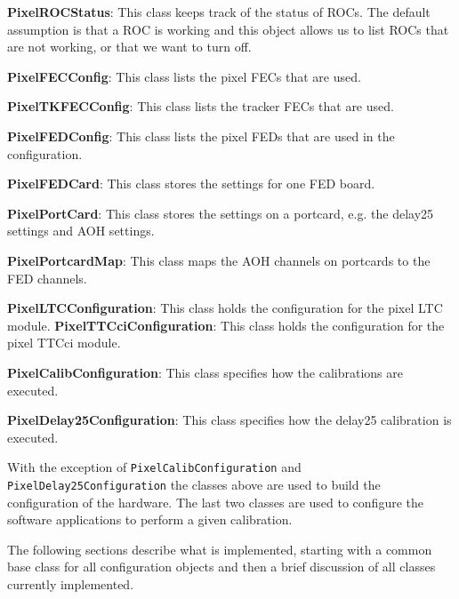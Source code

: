 \vskip 0.5cm
\noindent
{\bf PixelROCStatus}: This class keeps track of the status of 
                      ROCs. The default assumption is that a ROC
                      is working and this object allows us to 
                      list ROCs that are not working, or that we 
                      want to turn off.

\vskip 0.5cm
\noindent
{\bf PixelFECConfig}: This class lists the pixel FECs that are used.

\vskip 0.5cm
\noindent
{\bf PixelTKFECConfig}: This class lists the tracker FECs that are used.

\vskip 0.5cm
\noindent
{\bf PixelFEDConfig}: This class lists the pixel FEDs that are used in
                      the configuration.

\vskip 0.5cm
\noindent
{\bf PixelFEDCard}: This class stores the settings for one FED board.

\vskip 0.5cm
\noindent
{\bf PixelPortCard}: This class stores the settings on a portcard, e.g.
                     the delay25 settings and AOH settings.

\vskip 0.5cm
\noindent
{\bf PixelPortcardMap}: This class maps the AOH channels on portcards
                        to the FED channels.


\vskip 0.5cm
\noindent
{\bf PixelLTCConfiguration}: This class holds the configuration for the 
                             pixel LTC module.
\vskip 0.5cm
\noindent
{\bf PixelTTCciConfiguration}: This class holds the configuration for the 
                               pixel TTCci module.

\vskip 0.5cm
\noindent
{\bf PixelCalibConfiguration}: This class specifies how the calibrations
                               are executed. 

\vskip 0.5cm
\noindent
{\bf PixelDelay25Configuration}: This class specifies how the delay25 
                                 calibration is executed.

\vskip 0.5cm


With the exception of {\tt PixelCalibConfiguration} and 
{\tt PixelDelay25Configuration} the classes above are used to build the
configuration of the hardware. The last two classes are used to 
configure the software applications to perform a given 
calibration.


The following sections describe what is implemented, starting with
a common base class for all configuration objects and then a
brief discussion of all classes currently implemented.

